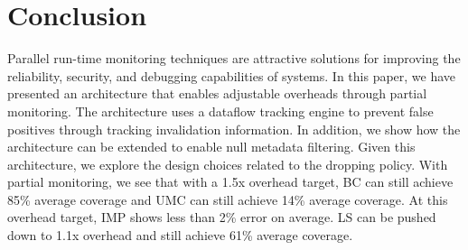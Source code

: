 \section{Conclusion}
\label{sec:conclusion}

Parallel run-time monitoring techniques are attractive solutions for improving
the reliability, security, and debugging capabilities of systems. In this
paper, we have presented an architecture that enables adjustable overheads through partial monitoring. 
The architecture uses a dataflow tracking engine to prevent false positives
through tracking invalidation information. In addition, we show how the
architecture can be extended to enable null metadata filtering.
Given this architecture, we explore the design choices related to the dropping policy.
With partial monitoring, we see that with a 1.5x overhead target, BC can still
achieve 85\% average coverage and UMC can still achieve 14\% 
average coverage.
At this overhead target, IMP shows less than 2\% error on average.
LS can be pushed down to 1.1x overhead and still achieve 61\% average coverage.


